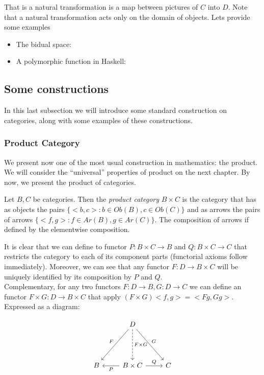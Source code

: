   That is a natural transformation is a map between pictures of $C$ into $D$. Note that a natural transformation acts only on the domain of objects. Lets provide some examples

  \begin{example}
    \begin{itemize}
    \item The bidual space:
    \item A polymorphic function in Haskell:
    \end{itemize}
  \end{example}

  
\subsection{Some constructions}
In this last subsection we will introduce some standard construction on categories, along with some examples of these constructions.


\subsubsection{Product Category}
We present now one of the most usual construction in mathematics: the product. We will consider the ``universal'' properties of product on the next chapter. By now, we present the product of categories.

\begin{definition}
  Let $B,C$ be categories. Then the \emph{product category} $B\times C$ is the category that has as objects the pairs $\{<b,c>: b \in Ob(B), c\in Ob(C)\}$ and as arrows the pairs of arrows $\{<f,g>: f \in Ar(B), g\in Ar(C)\}$. The composition of arrows if defined by the elementwise composition. 
\end{definition}

It is clear that we can define to functor $P: B\times C \to B$ and $Q: B \times C \to C$ that restricts the category to each of its component parts (functorial axioms follow immediately). Moreover, we can see that any functor $F:D\to B\times C$ will be uniquely identified by its composition by $P$ and $Q$.\\

Complementary, for any two functors $F:D\to B, G:D\to C$ we can define an functor $F \times G : D \to B\times C$ that apply $(F\times G) <f,g> = <Fg, Gg>$. Expressed as a diagram: 

\[
\begin{tikzcd}
  {} & D
  \arrow[swap, "F"]{ddl}
  \arrow[dashed, "F\times G"]{dd}
  \arrow["G"]{ddr}\\
  {} & \\
  B & B \times C
  \arrow["P"]{l}
  \arrow["Q"]{r} & C
\end{tikzcd}
\]

